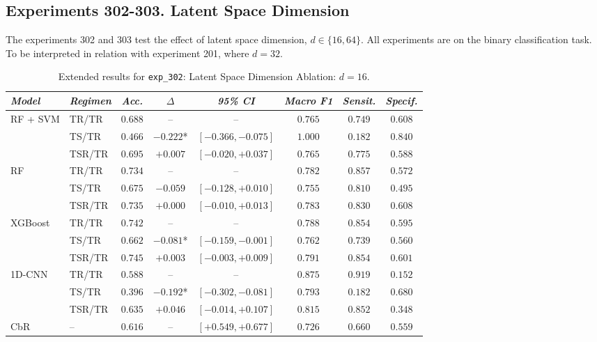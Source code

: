 \newpage
\subsection*{Experiments 302-303. Latent Space Dimension}
The experiments 302 and 303 test the effect of latent space dimension, $d \in \{16,64\}$. All experiments are on the binary classification task. To be interpreted in relation with experiment 201, where $d=32$.

\begin{table}[H]
\centering
\scriptsize
\caption{Extended results for \texttt{exp\_302}: Latent Space Dimension Ablation: $d=16$.}
\label{tab:appendix_exp_302}
\begin{tabular*}{\textwidth}{@{\extracolsep{\fill}}llcccccc}
\toprule
\emph{Model} & \emph{Regimen} & \emph{Acc.} & \emph{$\Delta$} & \emph{95\% CI} & \emph{Macro F1} & \emph{Sensit.} & \emph{Specif.}\\
\midrule
\multirow{3}{*}{RF + SVM} & TR/TR & $0.688$ & -- & -- & $0.765$ & $0.749$ & $0.608$\\
 & TS/TR & $0.466$ & $-0.222$* & $[-0.366, -0.075]$ & $1.000$ & $0.182$ & $0.840$\\
 & TSR/TR & $0.695$ & $+0.007$ & $[-0.020, +0.037]$ & $0.765$ & $0.775$ & $0.588$\\
\midrule
\multirow{3}{*}{RF} & TR/TR & $0.734$ & -- & -- & $0.782$ & $0.857$ & $0.572$\\
 & TS/TR & $0.675$ & $-0.059$ & $[-0.128, +0.010]$ & $0.755$ & $0.810$ & $0.495$\\
 & TSR/TR & $0.735$ & $+0.000$ & $[-0.010, +0.013]$ & $0.783$ & $0.830$ & $0.608$\\
\midrule
\multirow{3}{*}{XGBoost} & TR/TR & $0.742$ & -- & -- & $0.788$ & $0.854$ & $0.595$\\
 & TS/TR & $0.662$ & $-0.081$* & $[-0.159, -0.001]$ & $0.762$ & $0.739$ & $0.560$\\
 & TSR/TR & $0.745$ & $+0.003$ & $[-0.003, +0.009]$ & $0.791$ & $0.854$ & $0.601$\\
\midrule
\multirow{3}{*}{1D-CNN} & TR/TR & $0.588$ & -- & -- & $0.875$ & $0.919$ & $0.152$\\
 & TS/TR & $0.396$ & $-0.192$* & $[-0.302, -0.081]$ & $0.793$ & $0.182$ & $0.680$\\
 & TSR/TR & $0.635$ & $+0.046$ & $[-0.014, +0.107]$ & $0.815$ & $0.852$ & $0.348$\\
\midrule
CbR & -- & $0.616$ & -- & $[+0.549, +0.677]$ & $0.726$ & $0.660$ & $0.559$\\
\bottomrule
\end{tabular*}
\end{table}

